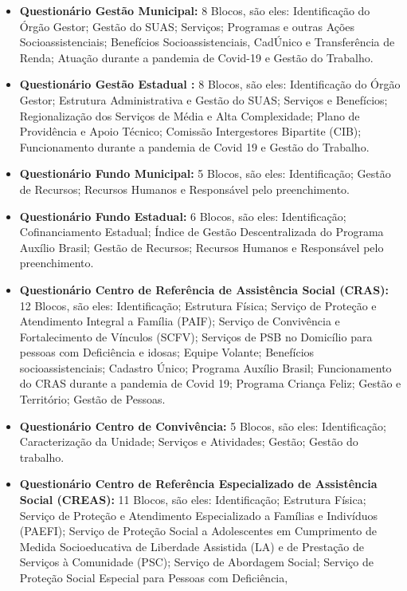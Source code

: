 \documentclass[
  letterpaper,
  DIV=11,
  numbers=noendperiod]{scrreprt}
\begin{document}
\begin{itemize}
\item
  \textbf{Questionário Gestão Municipal:} 8 Blocos, são eles:
  Identificação do Órgão Gestor; Gestão do SUAS; Serviços; Programas e
  outras Ações Socioassistenciais; Benefícios Socioassistenciais,
  CadÚnico e Transferência de Renda; Atuação durante a pandemia de
  Covid-19 e Gestão do Trabalho.
\item
  \textbf{Questionário Gestão Estadual :} 8 Blocos, são eles:
  Identificação do Órgão Gestor; Estrutura Administrativa e Gestão do
  SUAS; Serviços e Benefícios; Regionalização dos Serviços de Média e
  Alta Complexidade; Plano de Providência e Apoio Técnico; Comissão
  Intergestores Bipartite (CIB); Funcionamento durante a pandemia de
  Covid 19 e Gestão do Trabalho.
\item
  \textbf{Questionário Fundo Municipal:} 5 Blocos, são eles:
  Identificação; Gestão de Recursos; Recursos Humanos e Responsável pelo
  preenchimento.
\item
  \textbf{Questionário Fundo Estadual:} 6 Blocos, são eles:
  Identificação; Cofinanciamento Estadual; Índice de Gestão
  Descentralizada do Programa Auxílio Brasil; Gestão de Recursos;
  Recursos Humanos e Responsável pelo preenchimento.
\item
  \textbf{Questionário Centro de Referência de Assistência Social
  (CRAS):} 12 Blocos, são eles: Identificação; Estrutura Física; Serviço
  de Proteção e Atendimento Integral a Família (PAIF); Serviço de
  Convivência e Fortalecimento de Vínculos (SCFV); Serviços de PSB no
  Domicílio para pessoas com Deficiência e idosas; Equipe Volante;
  Benefícios socioassistenciais; Cadastro Único; Programa Auxílio
  Brasil; Funcionamento do CRAS durante a pandemia de Covid 19; Programa
  Criança Feliz; Gestão e Território; Gestão de Pessoas.
\item
  \textbf{Questionário Centro de Convivência:} 5 Blocos, são eles:
  Identificação; Caracterização da Unidade; Serviços e Atividades;
  Gestão; Gestão do trabalho.
\item
  \textbf{Questionário Centro de Referência Especializado de Assistência
  Social (CREAS):} 11 Blocos, são eles: Identificação; Estrutura Física;
  Serviço de Proteção e Atendimento Especializado a Famílias e
  Indivíduos (PAEFI); Serviço de Proteção Social a Adolescentes em
  Cumprimento de Medida Socioeducativa de Liberdade Assistida (LA) e de
  Prestação de Serviços à Comunidade (PSC); Serviço de Abordagem Social;
  Serviço de Proteção Social Especial para Pessoas com Deficiência,

\end{itemize}
\end{document}
